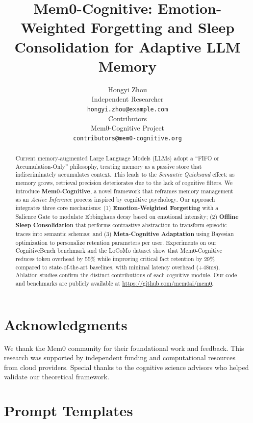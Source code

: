 \documentclass[11pt]{article}
\title{Mem0-Cognitive: Emotion-Weighted Forgetting and Sleep Consolidation for Adaptive LLM Memory}
\author{Hongyi Zhou \\
  Independent Researcher \\
  \texttt{hongyi.zhou@example.com} \\
  \And
  Contributors \\
  Mem0-Cognitive Project \\
  \texttt{contributors@mem0-cognitive.org} \\
}
\begin{document}
\maketitle

\begin{abstract}
Current memory-augmented Large Language Models (LLMs) adopt a ``FIFO or Accumulation-Only'' philosophy, treating memory as a passive store that indiscriminately accumulates context. This leads to the \textit{Semantic Quicksand} effect: as memory grows, retrieval precision deteriorates due to the lack of cognitive filters. We introduce \textbf{Mem0-Cognitive}, a novel framework that reframes memory management as an \textit{Active Inference} process inspired by cognitive psychology. Our approach integrates three core mechanisms: (1) \textbf{Emotion-Weighted Forgetting} with a Salience Gate to modulate Ebbinghaus decay based on emotional intensity; (2) \textbf{Offline Sleep Consolidation} that performs contrastive abstraction to transform episodic traces into semantic schemas; and (3) \textbf{Meta-Cognitive Adaptation} using Bayesian optimization to personalize retention parameters per user. Experiments on our CognitiveBench benchmark and the LoCoMo dataset show that Mem0-Cognitive reduces token overhead by 55\% while improving critical fact retention by 29\% compared to state-of-the-art baselines, with minimal latency overhead (+48ms). Ablation studies confirm the distinct contributions of each cognitive module. Our code and benchmarks are publicly available at \url{https://github.com/mem0ai/mem0}.
\end{abstract}







\section*{Acknowledgments}
We thank the Mem0 community for their foundational work and feedback. This research was supported by independent funding and computational resources from cloud providers. Special thanks to the cognitive science advisors who helped validate our theoretical framework.




\appendix
\section{Prompt Templates}
\label{app:prompts}
\end{document}

